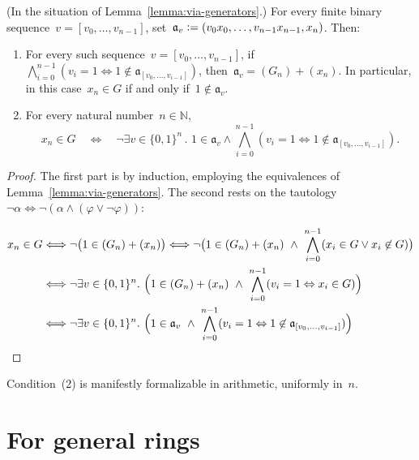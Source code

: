 \documentclass[envcountsect,envcountsame,runningheads]{llncs}
\newcommand{\aaa}{\mathfrak{a}}
\newcommand{\NN}{\mathbb{N}}
\newcommand{\defeq}{\vcentcolon=}
\renewcommand{\_}{\mathpunct{.}\,}
\begin{document}
\begin{lemma}\label{lemma:uniform-char}(In the situation of Lemma~\ref{lemma:via-generators}.)
For every finite binary sequence~$v = [v_0,\ldots,v_{n-1}]$, set~$\aaa_v
\defeq (v_0x_0,\ldots,v_{n-1}x_{n-1},x_n)$. Then:
\begin{enumerate}
\item For every such sequence~$v = [v_0,\ldots,v_{n-1}]$, if
$\bigwedge_{i=0}^{n-1} (v_i = 1 \Leftrightarrow 1 \not\in \aaa_{[v_0,\ldots,v_{i-1}]})$,
then~$\aaa_v = (G_n) + (x_n)$.
In particular, in this case~$x_n \in G$ if and only if~$1 \not\in \aaa_v$.
\item For every natural number~$n \in \NN$,
\vspace*{-1.2em}
\[ x_n \in G \quad\Longleftrightarrow\quad \neg
  \exists v \in \{0,1\}^n\_
    1 \in \aaa_v \wedge
      \bigwedge_{i=0}^{n-1} (v_i = 1 \Leftrightarrow 1 \not\in \aaa_{[v_0,\ldots,v_{i-1}]}). \]
\end{enumerate}
\end{lemma}

\begin{proof}The first part is by induction, employing the equivalences of
Lemma~\ref{lemma:via-generators}. The second rests on the tautology
$\neg\alpha \Longleftrightarrow \neg(\alpha \wedge (\varphi \vee \neg\varphi))$:

\vspace*{-1.2em}\small
\begin{align*}
  x_n \in G &
  \Longleftrightarrow \neg\bigl(1 \in (G_n) + (x_n)\bigr)
  \Longleftrightarrow \neg\bigl(1 \in (G_n) + (x_n) \ \wedge\ \bigwedge_{i=0}^{n-1} (x_i \in G \vee x_i \not\in G)\bigr) \\
  & \Longleftrightarrow \neg\exists v \in \{0,1\}^n\_
    \Bigl(1 \in (G_n) + (x_n) \ \wedge\ \bigwedge_{i=0}^{n-1} (v_i = 1
    \Leftrightarrow x_i \in G)\Bigr) \\
  & \Longleftrightarrow \neg\exists v \in \{0,1\}^n\_
    \Bigl(1 \in \aaa_v \ \wedge\ \bigwedge_{i=0}^{n-1} (v_i = 1
    \Leftrightarrow 1 \not\in \aaa_{[v_0,\ldots,v_{i-1}]})\Bigr) %
\end{align*}
\end{proof}

\noindent
Condition~(2) is manifestly formalizable in
arithmetic, uniformly in~$n$.


\section{For general rings}
\label{sect:wlog}
\end{document}
